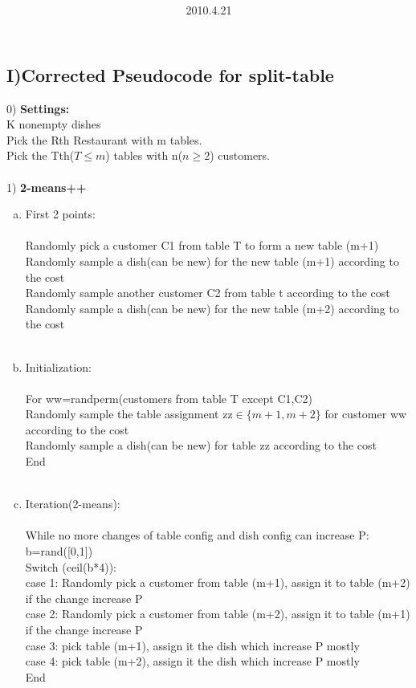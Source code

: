 \documentclass{article}
\title{\vspace{0.3in}\textmd{\textbf{\hmwkTitle}}}
\date{2010.4.21}
\author{\textbf{\hmwkAuthorName}}
\begin{document}
\begin{spacing}{1.1}
\maketitle

\section{I)Corrected Pseudocode for split-table}

0) {\bf Settings:} \\ K nonempty dishes \\ Pick the Rth Restaurant with m tables.\\Pick the Tth($T\leq m$) tables with n($n\geq 2$) customers.\\ \\
1) {\bf 2-means++} 
\begin{enumerate}[(a)]
\item First 2 points:\\ \\
Randomly pick a customer C1 from table T to form a new table (m+1)\\
Randomly sample a dish(can be new) for the new table (m+1) according to the cost\\
Randomly sample another customer C2 from table t according to the cost\\
Randomly sample a dish(can be new) for the new table (m+2) according to the cost\\ \\
\item Initialization:\\ \\
For ww=randperm(customers from table T except C1,C2) \\ 
Randomly sample the table assignment zz$\in \{m+1,m+2\}$ for customer ww according to the cost\\
Randomly sample a dish(can be new) for table zz according to the cost\\
End \\ \\
\item Iteration(2-means):\\ \\
While no more changes of table config and dish config can increase P:\\
b=rand([0,1]) \\
Switch (ceil(b*4)):\\
case 1: Randomly pick a customer from table (m+1), assign it to table (m+2) if the change increase P\\
case 2: Randomly pick a customer from table (m+2), assign it to table (m+1) if the change increase P\\
case 3: pick table (m+1), assign it the dish which increase P mostly\\
case 4: pick table (m+2), assign it the dish which increase P mostly\\
End\\
\end{enumerate}  

\end{spacing}
\end{document}
